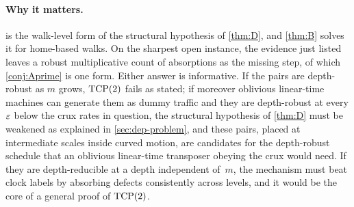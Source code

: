 \paragraph{Why it matters.}  is the walk-level form of the structural hypothesis of \cref{thm:D}, and
\cref{thm:B} solves it for home-based walks. On the sharpest open instance, the evidence just listed leaves a robust
multiplicative count of absorptions as the missing step, of which \cref{conj:Aprime} is one form. Either answer is
informative. If the pairs are depth-robust as $m$ grows, $\mathrm{TCP}(2)$ fails as stated; if moreover oblivious linear-time
machines can generate them as dummy traffic and they are depth-robust at every $\varepsilon$ below the crux rates in question, the structural hypothesis of \cref{thm:D} must be weakened as explained in
\cref{sec:dep-problem}, and these pairs, placed at intermediate scales inside curved motion, are candidates for the depth-robust schedule that
an oblivious linear-time transposer obeying the crux would need. If they are depth-reducible at a depth independent
of~$m$, the mechanism must beat clock
labels by absorbing defects consistently across levels, and it would be the core of a general proof of $\mathrm{TCP}(2)$.
